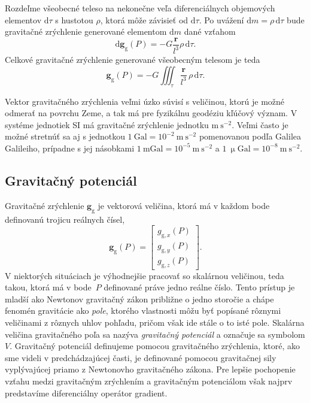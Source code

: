 \documentclass[a4paper, 12pt]{book}
\newcommand{\diff}{\mathrm d}
\newcommand{\gidx}{\mathrm g}
\let\vec\mathbf
\begin{document}
Rozdeľme všeobecné teleso na nekonečne veľa diferenciálnych objemových 
elementov $\diff\tau$ s hustotou $\rho$, ktorá môže závisieť od $\diff\tau$.  
Po uvážení $\diff m = \rho \, \diff \tau$ bude gravitačné zrýchlenie generované 
elementom $\diff m$ dané vzťahom
%
\begin{equation}
\label{eq:gravitational_vector}
\diff \vec g_\gidx(P) = -G \frac{\vec r}{l^3} \rho \, \diff\tau{.}
\end{equation}
%
Celkové gravitačné zrýchlenie generované všeobecným telesom je teda
%
\begin{equation}
\label{eq:gravitational_vector_integral}
\vec g_\gidx(P) = -G \iiint_{\tau} \frac{\vec r}{l^3} \, \rho \, \diff\tau{.}
\end{equation}

Vektor gravitačného zrýchlenia veľmi úzko súvisí s veličinou, ktorú je možné 
odmerať na povrchu Zeme, a tak má pre fyzikálnu geodéziu kľúčový význam.  
V systéme jednotiek SI má gravitačné zrýchlenie jednotku $\mathrm{m}\ 
\mathrm{s}^{-2}$.  Veľmi často je možné stretnúť sa aj s jednotkou $1\ 
\mathrm{Gal} = 10^{-2}\ \mathrm{m}\ \mathrm{s}^{-2}$ pomenovanou podľa Galilea 
Galileiho, prípadne s jej násobkami $1\ \mathrm{mGal} = 10^{-5}\ \mathrm{m}\ 
\mathrm{s}^{-2}$ a $1\ \upmu \mathrm{Gal} = 10^{-8}\ \mathrm{m}\ 
\mathrm{s}^{-2}$.

\subsection{Gravitačný potenciál}

Gravitačné zrýchlenie $\vec g_\gidx$ je vektorová veličina, ktorá má v každom 
bode definovanú trojicu reálnych čísel,
%
\begin{equation}
\vec g_{\gidx}(P) =
\begin{bmatrix}
g_{\gidx,x}(P) \\[2ex]
g_{\gidx,y}(P) \\[2ex]
g_{\gidx,z}(P)
\end{bmatrix}
{.}
\end{equation}
%
V niektorých situáciach je výhodnejšie pracovať so skalárnou veličinou, teda 
takou, ktorá má v bode~$P$ definované práve jedno reálne číslo.  Tento prístup 
je mladší ako Newtonov gravitačný zákon približne o jedno storočie 
\citep{Jekeli2015} a chápe fenomén gravitácie ako \emph{pole}, ktorého 
vlastnosti môžu byť popísané rôznymi veličinami z rôznych uhlov pohľadu, pričom 
však ide stále o to isté pole.  Skalárna veličina gravitačného poľa sa nazýva 
\emph{gravitačný potenciál} a označuje sa symbolom $V$.  Gravitačný potenciál 
definujeme pomocou gravitačného zrýchlenia, ktoré, ako sme videli 
v predchádzajúcej časti, je definované pomocou gravitačnej sily vyplývajúcej 
priamo z Newtonovho gravitačného zákona.  Pre lepšie pochopenie vzťahu medzi 
gravitačným zrýchlením a gravitačným potenciálom však najprv predstavíme 
diferenciálny operátor gradient.
\end{document}
